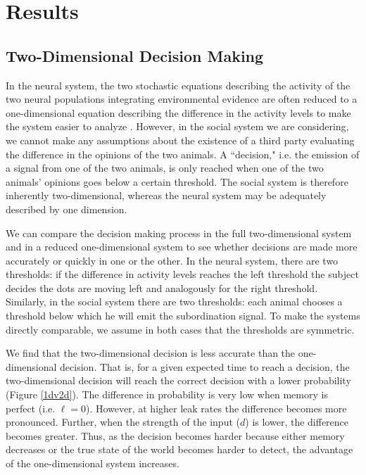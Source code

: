 \documentclass{article}
\begin{document}
\section{Results}

\subsection{Two-Dimensional Decision Making }
In the neural system, the two stochastic equations describing the activity of the two neural populations integrating environmental evidence are often reduced to a one-dimensional equation describing the difference in the activity levels to make the system easier to analyze \cite{Brown:2005fk,Bogacz:2006uq,Feng:2009kl}.  However, in the social system we are considering, we cannot make any assumptions about the existence of a third party evaluating the difference in the opinions of the two animals.  A ``decision," i.e. the emission of a signal from one of the two animals, is only reached when one of the two animals' opinions goes below a certain threshold.  The social system is therefore inherently two-dimensional, whereas the neural system may be adequately described by one dimension. 

We can compare the decision making process in the full two-dimensional system and in a reduced one-dimensional system to see whether decisions are made more accurately or quickly in one or the other. In the neural system, there are two thresholds: if the difference in activity levels reaches the left threshold the subject decides the dots are moving left and analogously for the right threshold.  Similarly, in the social system there are two thresholds: each animal chooses a threshold below which he will emit the subordination signal. To make the systems directly comparable, we assume in both cases that the thresholds are symmetric.

We find that the two-dimensional decision is less accurate than the one-dimensional decision.  That is, for a given expected time to reach a decision, the two-dimensional decision will reach the correct decision with a lower probability (Figure \ref{1dv2d}).  The difference in probability is very low when memory is perfect (i.e. $\ell=0$).  However, at higher leak rates the difference becomes more pronounced.  Further, when the strength of the input ($d$) is lower, the difference becomes greater.  Thus, as the decision becomes harder because either memory decreases or the true state of the world becomes harder to detect, the advantage of the one-dimensional system increases.
\end{document}
